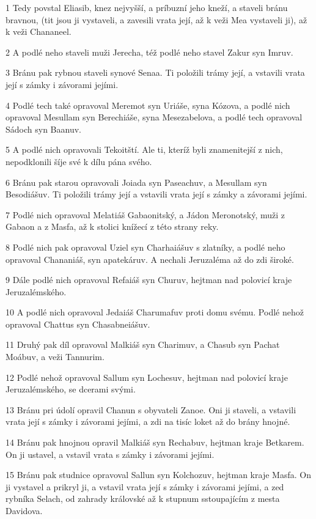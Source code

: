 \par 1 Tedy povstal Eliasib, knez nejvyšší, a príbuzní jeho kneží, a staveli bránu bravnou, (tit jsou ji vystaveli, a zavesili vrata její, až k veži Mea vystaveli ji), až k veži Chananeel.
\par 2 A podlé neho staveli muži Jerecha, též podlé neho stavel Zakur syn Imruv.
\par 3 Bránu pak rybnou staveli synové Senaa. Ti položili trámy její, a vstavili vrata její s zámky i závorami jejími.
\par 4 Podlé tech také opravoval Meremot syn Uriáše, syna Kózova, a podlé nich opravoval Mesullam syn Berechiáše, syna Mesezabelova, a podlé tech opravoval Sádoch syn Baanuv.
\par 5 A podlé nich opravovali Tekoitští. Ale ti, kteríž byli znamenitejší z nich, nepodklonili šíje své k dílu pána svého.
\par 6 Bránu pak starou opravovali Joiada syn Paseachuv, a Mesullam syn Besodiášuv. Ti položili trámy její a vstavili vrata její s zámky a závorami jejími.
\par 7 Podlé nich opravoval Melatiáš Gabaonitský, a Jádon Meronotský, muži z Gabaon a z Masfa, až k stolici knížecí z této strany reky.
\par 8 Podlé nich pak opravoval Uziel syn Charhaiášuv s zlatníky, a podlé neho opravoval Chananiáš, syn apatekáruv. A nechali Jeruzaléma až do zdi široké.
\par 9 Dále podlé nich opravoval Refaiáš syn Churuv, hejtman nad polovicí kraje Jeruzalémského.
\par 10 A podlé nich opravoval Jedaiáš Charumafuv proti domu svému. Podlé nehož opravoval Chattus syn Chasabneiášuv.
\par 11 Druhý pak díl opravoval Malkiáš syn Charimuv, a Chasub syn Pachat Moábuv, a veži Tannurim.
\par 12 Podlé nehož opravoval Sallum syn Lochesuv, hejtman nad polovicí kraje Jeruzalémského, se dcerami svými.
\par 13 Bránu pri údolí opravil Chanun s obyvateli Zanoe. Oni ji staveli, a vstavili vrata její s zámky i závorami jejími, a zdi na tisíc loket až do brány hnojné.
\par 14 Bránu pak hnojnou opravil Malkiáš syn Rechabuv, hejtman kraje Betkarem. On ji ustavel, a vstavil vrata s zámky i závorami jejími.
\par 15 Bránu pak studnice opravoval Sallun syn Kolchozuv, hejtman kraje Masfa. On ji vystavel a prikryl ji, a vstavil vrata její s zámky i závorami jejími, a zed rybníka Selach, od zahrady královské až k stupnum sstoupajícím z mesta Davidova.
